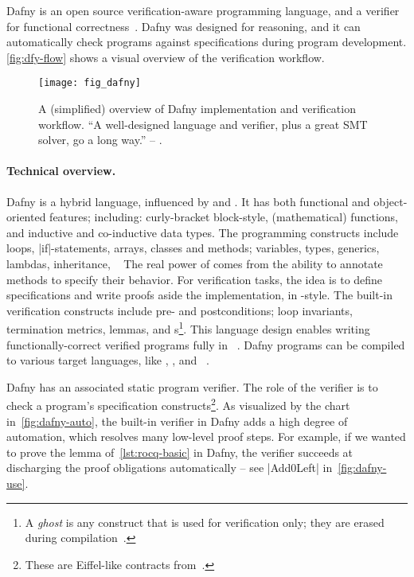 Dafny is an open source verification-aware programming language, and a verifier for functional correctness~\cite{leino2010,dafnylang}.
Dafny was designed for reasoning, and it can automatically check programs against specifications during program development.
\autoref{fig:dfy-flow} shows a visual overview of the verification workflow.

\begin{figure}[ht]
\centering
\texttt{[image: fig\_dafny]}
\caption[Overview of Dafny implementation and verification workflow]{
A (simplified) overview of Dafny implementation and verification workflow.
\enquote{A well-designed language and verifier, plus a great SMT solver, go a long way.} -- \textcite{leino2010b}.}
\label{fig:dfy-flow}
\end{figure}

\paragraph*{Technical overview.}
Dafny is a hybrid language, influenced by  and .
It has both functional and object-oriented features;
including: curly-bracket block-style, (mathematical) functions, and inductive and co-inductive data types.
The programming constructs include loops, \pr|if|-statements, arrays, classes and methods;
variables, types, generics, lambdas, inheritance, \etc~\cite{dafnydoc}
The real power of  comes from the ability to annotate methods to specify their behavior.
For verification tasks, the idea is to define specifications and write proofs aside the implementation, in -style.
The built-in verification constructs include pre- and postconditions;
loop invariants, termination metrics, lemmas, and s\footnote{
A \emph{ghost} is any construct that is used for verification only; they are erased during compilation~\cite[p. 19]{leino2023}.}.
This language design enables writing functionally-correct verified programs fully in ~\cite{leino2023}.
Dafny programs can be compiled to various target languages, like , , and ~\cite{dafnydoc}.

Dafny has an associated static program verifier.
The role of the verifier is to check a program's specification constructs\footnote{These are Eiffel-like contracts from~\cite{meyer1988}.}.
As visualized by the chart in~\autoref{fig:dafny-auto},
the built-in verifier in Dafny adds a high degree of automation, which resolves many low-level proof steps.
For example, if we wanted to prove the lemma of~\autoref{lst:rocq-basic} in Dafny, the verifier succeeds at discharging the proof obligations automatically -- see \pr|Add0Left| in~\autoref{fig:dafny-use}.

